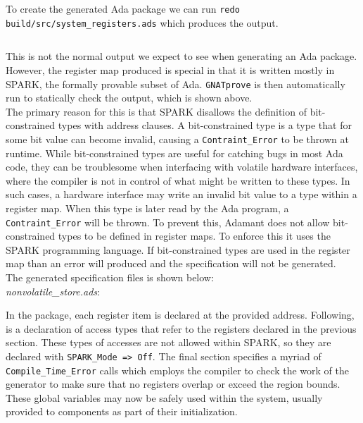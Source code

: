 To create the generated Ada package we can run \texttt{redo build/src/system\_registers.ads} which produces the output.

\vspace{5mm} %
\inputminted{text}{../example_architecture/register_map/output.txt}
\vspace{5mm} %

This is not the normal output we expect to see when generating an Ada package. However, the register map produced is special in that it is written mostly in SPARK, the formally provable subset of Ada. \texttt{GNATprove} is then automatically run to statically check the output, which is shown above. \\

The primary reason for this is that SPARK disallows the definition of bit-constrained types with address clauses. A bit-constrained type is a type that for some bit value can become invalid, causing a \texttt{Contraint\_Error} to be thrown at runtime. While bit-constrained types are useful for catching bugs in most Ada code, they can be troublesome when interfacing with volatile hardware interfaces, where the compiler is not in control of what might be written to these types. In such cases, a hardware interface may write an invalid bit value to a type within a register map. When this type is later read by the Ada program, a \texttt{Contraint\_Error} will be thrown. To prevent this, Adamant does not allow bit-constrained types to be defined in register maps. To enforce this it uses the SPARK programming language. If bit-constrained types are used in the register map than an error will produced and the specification will not be generated. \\

The generated specification files is shown below: \\

\textit{nonvolatile\_store.ads}:

In the package, each register item is declared at the provided address. Following, is a declaration of access types that refer to the registers declared in the previous section. These types of accesses are not allowed within SPARK, so they are declared with \texttt{SPARK\_Mode => Off}. The final section specifies a myriad of \texttt{Compile\_Time\_Error} calls which employs the compiler to check the work of the generator to make sure that no registers overlap or exceed the region bounds. These global variables may now be safely used within the system, usually provided to components as part of their initialization. \\

